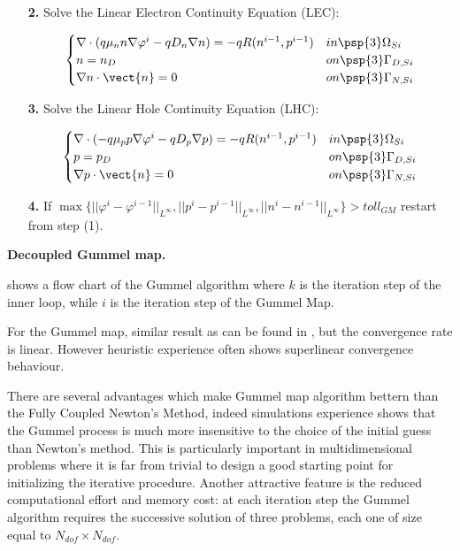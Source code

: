 {\begin{itemize}
\item[\bf 2.] Solve the Linear Electron Continuity Equation (LEC):

\vspace{-0.5cm}

\begin{equation}
\label{eq: LEC system}
\begin{cases}
 \nabla \cdot ( q\mu_n n \nabla \varphi^i - qD_n \nabla n ) = -qR(n^{i-1},p^{i-1}) & in \psp{3} \Omega_{Si}
 \\
 n = n_D & on \psp{3} \Gamma_{D,Si}
 \\
 \nabla n \cdot \vect{n} = 0 & on \psp{3} \Gamma_{N,Si}
\end{cases}
\end{equation}

\item[\bf 3.] Solve the Linear Hole Continuity Equation (LHC):

\vspace{-0.5cm}

\begin{equation}
\label{eq: LHC system}
\begin{cases}
\nabla \cdot (- q\mu_p p \nabla \varphi^i - qD_p \nabla p ) =  -qR(n^{i-1},p^{i-1}) & in \psp{3} \Omega_{Si}
\\
 p = p_D & on \psp{3} \Gamma_{D,Si}
 \\
 \nabla p \cdot \vect{n} = 0 & on \psp{3} \Gamma_{N,Si}
\end{cases}
\end{equation}

\item[\bf 4.] If $\max\{||\varphi^i-\varphi^{i-1}||_{L^{\infty}},||p^i-p^{i-1}||_{L^{\infty}},||n^i-n^{i-1}||_{L^{\infty}}\}>toll_{GM}$ restart from step (1).


\end{itemize}

}{\textbf{Decoupled Gummel map.}}

  shows a flow chart of the Gummel algorithm where $k$ is the iteration step of the inner loop, while $i$ is the iteration step of the Gummel Map.
 
For the Gummel map, similar result as   can be found in \cite{Jerome:AnalyCharTran}, but the convergence rate is linear. However heuristic experience often shows superlinear convergence behaviour.

There are several advantages which make Gummel map algorithm bettern than the Fully Coupled Newton's Method, indeed simulations experience shows that the Gummel process is much more insensitive to the choice of the initial guess than Newton's method. This is particularly important in multidimensional problems where it is far from trivial to design a good starting point for initializing the iterative procedure. Another attractive feature is the reduced computational effort and memory cost: at each iteration step the Gummel algorithm requires the successive solution of three problems, each one of size equal to $N_{dof}\times N_{dof}$.





